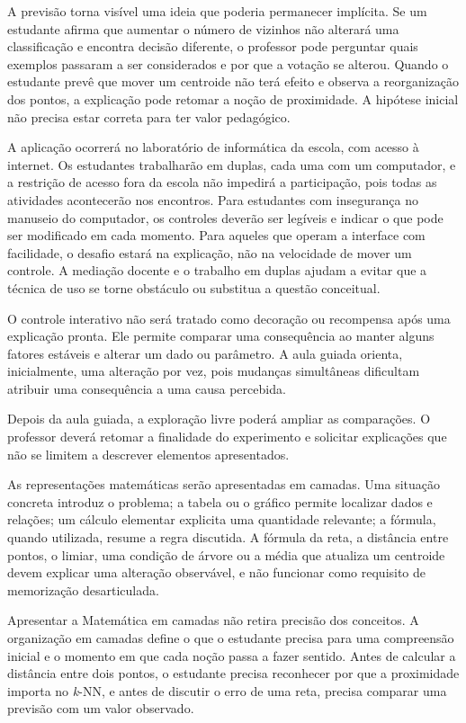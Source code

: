 A previsão torna visível uma ideia que poderia permanecer implícita. Se um estudante afirma que aumentar o número de vizinhos não alterará uma classificação e encontra decisão diferente, o professor pode perguntar quais exemplos passaram a ser considerados e por que a votação se alterou. Quando o estudante prevê que mover um centroide não terá efeito e observa a reorganização dos pontos, a explicação pode retomar a noção de proximidade. A hipótese inicial não precisa estar correta para ter valor pedagógico.

A aplicação ocorrerá no laboratório de informática da escola, com acesso à internet. Os estudantes trabalharão em duplas, cada uma com um computador, e a restrição de acesso fora da escola não impedirá a participação, pois todas as atividades acontecerão nos encontros. Para estudantes com insegurança no manuseio do computador, os controles deverão ser legíveis e indicar o que pode ser modificado em cada momento. Para aqueles que operam a interface com facilidade, o desafio estará na explicação, não na velocidade de mover um controle. A mediação docente e o trabalho em duplas ajudam a evitar que a técnica de uso se torne obstáculo ou substitua a questão conceitual.

O controle interativo não será tratado como decoração ou recompensa após uma explicação pronta. Ele permite comparar uma consequência ao manter alguns fatores estáveis e alterar um dado ou parâmetro. A aula guiada orienta, inicialmente, uma alteração por vez, pois mudanças simultâneas dificultam atribuir uma consequência a uma causa percebida.

Depois da aula guiada, a exploração livre poderá ampliar as comparações. O professor deverá retomar a finalidade do experimento e solicitar explicações que não se limitem a descrever elementos apresentados.

As representações matemáticas serão apresentadas em camadas. Uma situação concreta introduz o problema; a tabela ou o gráfico permite localizar dados e relações; um cálculo elementar explicita uma quantidade relevante; a fórmula, quando utilizada, resume a regra discutida. A fórmula da reta, a distância entre pontos, o limiar, uma condição de árvore ou a média que atualiza um centroide devem explicar uma alteração observável, e não funcionar como requisito de memorização desarticulada.

Apresentar a Matemática em camadas não retira precisão dos conceitos. A organização em camadas define o que o estudante precisa para uma compreensão inicial e o momento em que cada noção passa a fazer sentido. Antes de calcular a distância entre dois pontos, o estudante precisa reconhecer por que a proximidade importa no \textit{k}-NN, e antes de discutir o erro de uma reta, precisa comparar uma previsão com um valor observado.

